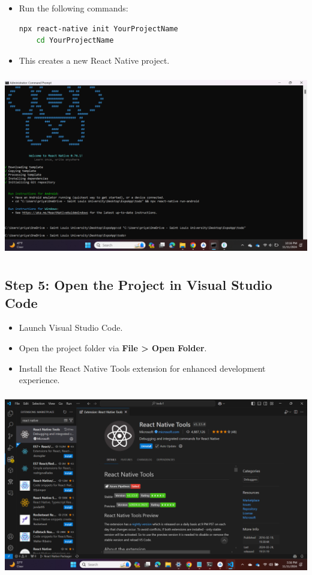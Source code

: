 \documentclass{article}
\begin{document}
\begin{itemize}
    \item Run the following commands:
    \begin{lstlisting}[language=bash]
    npx react-native init YourProjectName
    cd YourProjectName
    \end{lstlisting}
    \item This creates a new React Native project.
\end{itemize}
\includegraphics[width=5.57813in,height=3.13391in]{media/image18.png}

\subsection*{Step 5: Open the Project in Visual Studio Code}

\begin{itemize}
    \item Launch Visual Studio Code.
    \item Open the project folder via \textbf{File > Open Folder}.
    \item Install the React Native Tools extension for enhanced development experience.
\end{itemize}
\includegraphics[width=5.57813in,height=3.13391in]{media/image15.png}
\end{document}
